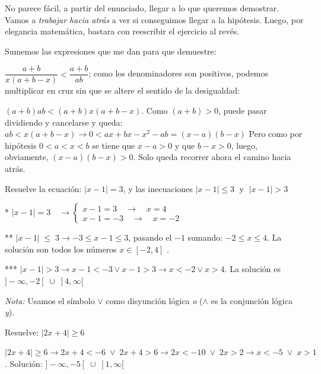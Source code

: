 		\begin{proofw}\renewcommand{\qedsymbol}{$\diamond$}
		
			No parece fácil, a partir del enunciado, llegar a lo que queremos demostrar. Vamos a \emph{trabajar hacia atrás} a ver si conseguimos llegar a la hipótesis. Luego, por elegancia matemática, bastara con reescribir el ejercicio al revés.
			
			Sumemos las expresiones que me dan para que demuestre:
			
			$\dfrac {a+b}{x(a+b-x)}<\dfrac {a+b}{ab}$; como los denominadores son positivos, podemos multiplicar en cruz sin que se altere el sentido de la desigualdad:
			
			 $(a+b)ab<(a+b)x(a+b-x)$. Como $(a+b)>0$, puede pasar dividiendo y cancelarse y queda: $ab<x(a+b-x) \to 0<ax+bx-x^2-ab=(x-a)(b-x)$ Pero como por hipótesis $0<a<x<b$ se tiene que $x-a>0$ y que $b-x>0$, luego, obviamente, $(x-a)(b-x)>0$. Solo queda recorrer ahora el camino hacia atrás.
		\end{proofw}
		
		\begin{ejre}
			Resuelve la ecuación: $|x-1|=3$, y las inecuaciones $|x-1|\le 3\; $ y $\; |x-1|>3$ 
		\end{ejre}
		
		\begin{proofw}\renewcommand{\qedsymbol}{$\diamond$} 
		
			
			* $|x-1| =3 \quad \rightarrow \left\{ 
			\begin{matrix} 
				x-1=3\quad \to \quad x=4 \\ 
				x-1=-3\quad \to \quad x=-2 
				\end{matrix} 
				\right. $
				
		
		 ** $|x-1|\; \le \; 3 \to -3\le x-1 \le 3$, pasando el $-1$ sumando: $-2\le x \le 4$. La solución son todos los números $x\in [-2,4]$ .
		
		 *** $|x-1|>3 \to x-1<-3 \vee x-1>3 \to x<-2 \vee x>4$. La solución es $]-\infty, -2[\; \cup\; ]4, \infty[$	
		\end{proofw}
		
		 \emph{Nota:} Usamos el símbolo $\vee$ como disyunción lógica \emph{o} ($\wedge$ es la conjunción lógica \emph{y}).
		
		\begin{ejre}
			Resuelve: $|2x+4|\ge 6$
		\end{ejre}
		
		\begin{proofw}\renewcommand{\qedsymbol}{$\diamond$}
		
			$|2x+4|\ge 6 \to 2x+4<-6 \; \vee \; 2x+4>6 \to 2x<-10\; \vee \; 2x>2 \to x<-5 \; \vee \; x>1$. Solución: $]-\infty, -5[\; \cup\; ]1, \infty[$
		\end{proofw}
		
